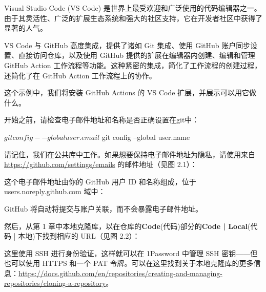 
Visual Studio Code (VS Code) 是世界上最受欢迎和广泛使用的代码编辑器之一。由于其灵活性、广泛的扩展生态系统和强大的社区支持，它在开发者社区中获得了显著的人气。

VS Code 与 GitHub 高度集成，提供了诸如 Git 集成、使用 GitHub 账户同步设置、直接访问仓库，以及使用 GitHub 提供的扩展在编辑器内创建、编辑和管理 GitHub Action 工作流程等功能。这种紧密的集成，简化了工作流程的创建过程，还简化了在 GitHub Action 工作流程上的协作。

这个示例中，我们将安装 GitHub Actions 的 VS Code 扩展，并展示可以用它做什么。


开始之前，请检查电子邮件地址和名称是否正确设置在git中：

\begin{shell}
$ git config --global user.email
$ git config --global user.name
\end{shell}

请记住，我们在公共库中工作。如果想要保持电子邮件地址为隐私，请使用来自 \url{https://github.com/settings/emails} 的邮件地址（见图 2.1）：


这个电子邮件地址由你的 GitHub 用户 ID 和名称组成，位于 users.noreply.github.com 域中：


GitHub 将自动将提交与账户关联，而不会暴露电子邮件地址。

然后，从第 1 章中本地克隆库，以在仓库的\textbf{Code}(代码)部分的\textbf{Code | Local}(代码 | 本地)下找到相应的 URL（见图 2.2）：


这里使用 SSH 进行身份验证，这样就可以在 1Password 中管理 SSH 密钥——但也可以使用 HTTPS 和一个 PAT 令牌。可以在这里找到关于本地克隆库的更多信息：\url{https://docs.github.com/en/repositories/creating-and-managing-repositories/cloning-a-repository}。


